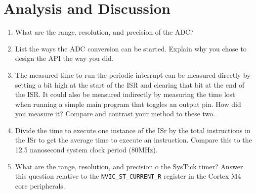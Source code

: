\documentclass[12pt]{article}
\begin{document}
\section{Analysis and Discussion}
\begin{enumerate}[1)]
  \item What are the range, resolution, and precision of the ADC?
  \item List the ways the ADC conversion can be started. Explain why
    you chose to design the API the way you did.
  \item The measured time to run the periodic interrupt can be
    measured directly by setting a bit high at the start of the ISR
    and clearing that bit at the end of the ISR. It could also be
    measured indirectly by measuring the time lost when running a
    simple main program that toggles an output pin. How did you measure
    it? Compare and contrast your method to these two.
  \item Divide the time to execute one instance of the ISr by the
    total instructions in the ISr to get the average time to execute
    an instruction. Compare this to the 12.5 nanosecond system clock
    period (80MHz).
  \item What are the range, resolution, and precision o the SysTick
    timer? Answer this question relative to the
    \verb|NVIC_ST_CURRENT_R| register in the Cortex M4 core peripherals.
\end{enumerate}
\end{document}
